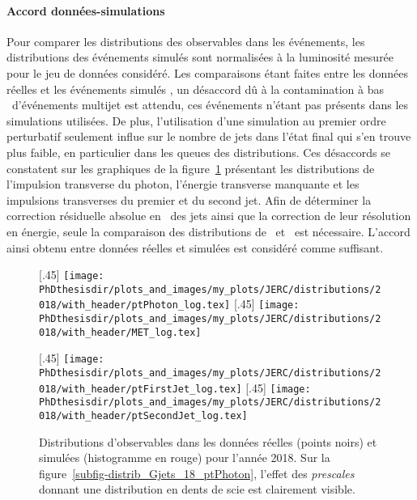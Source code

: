 \paragraph{Accord données-simulations}
Pour comparer les distributions des observables dans les événements, les distributions des événements simulés sont normalisées à la luminosité mesurée pour le jeu de données considéré.
Les comparaisons étant faites entre les données réelles et les événements simulés \Gjets, un désaccord dû à la contamination à bas \pT\ d'événements multijet est attendu, ces événements n'étant pas présents dans les simulations utilisées.
De plus, l'utilisation d'une simulation au premier ordre perturbatif seulement influe sur le nombre de jets dans l'état final qui s'en trouve plus faible, en particulier dans les queues des distributions.
Ces désaccords se constatent sur les graphiques de la figure~\ref{fig-distribs_Gjets_18} présentant les distributions de l'impulsion transverse du photon, l'énergie transverse manquante et les impulsions transverses du premier et du second jet.
Afin de déterminer la correction résiduelle absolue en \pT\ des jets ainsi que la correction de leur résolution en énergie, seule la comparaison des distributions de \Rbal\ et \RMPF\ est nécessaire.
L'accord ainsi obtenu entre données réelles et simulées est considéré comme suffisant.
\begin{figure}[h]
\centering
{}[.45\textwidth]
{\texttt{[image: \\PhDthesisdir/plots\_and\_images/my\_plots/JERC/distributions/2018/with\_header/ptPhoton\_log.tex]}}
\hfill
{}[.45\textwidth]
{\texttt{[image: \\PhDthesisdir/plots\_and\_images/my\_plots/JERC/distributions/2018/with\_header/MET\_log.tex]}}

\vspace{\baselineskip}

[.45\textwidth]
{\texttt{[image: \\PhDthesisdir/plots\_and\_images/my\_plots/JERC/distributions/2018/with\_header/ptFirstJet\_log.tex]}}
\hfill
{}[.45\textwidth]
{\texttt{[image: \\PhDthesisdir/plots\_and\_images/my\_plots/JERC/distributions/2018/with\_header/ptSecondJet\_log.tex]}}

\caption[Observables d'événements \Gjets\ en 2018.]{Distributions d'observables dans les données réelles (points noirs) et simulées (histogramme en rouge) pour l'année 2018. Sur la figure~\ref{subfig-distrib_Gjets_18_ptPhoton}, l'effet des \emph{prescales} donnant une distribution en dents de scie est clairement visible.}
\label{fig-distribs_Gjets_18}
\end{figure}
